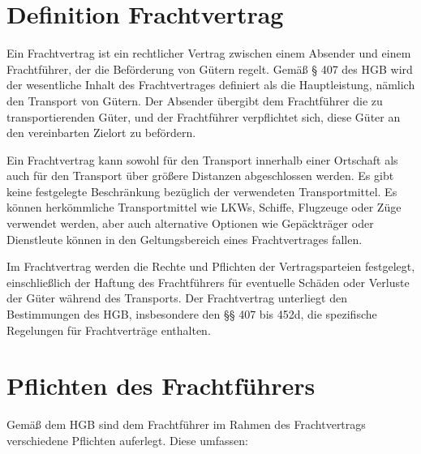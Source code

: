 \section[Definition]{Definition Frachtvertrag}

Ein Frachtvertrag ist ein rechtlicher Vertrag zwischen einem Absender und einem Frachtführer, der die Beförderung von Gütern regelt. Gemäß § 407 des \ac{HGB} wird der wesentliche Inhalt des Frachtvertrages definiert als die Hauptleistung, nämlich den Transport von Gütern. Der Absender übergibt dem Frachtführer die zu transportierenden Güter, und der Frachtführer verpflichtet sich, diese Güter an den vereinbarten Zielort zu befördern.

Ein Frachtvertrag kann sowohl für den Transport innerhalb einer Ortschaft als auch für den Transport über größere Distanzen abgeschlossen werden. Es gibt keine festgelegte Beschränkung bezüglich der verwendeten Transportmittel. Es können herkömmliche Transportmittel wie LKWs, Schiffe, Flugzeuge oder Züge verwendet werden, aber auch alternative Optionen wie Gepäckträger oder Dienstleute können in den Geltungsbereich eines Frachtvertrages fallen.

Im Frachtvertrag werden die Rechte und Pflichten der Vertragsparteien festgelegt, einschließlich der Haftung des Frachtführers für eventuelle Schäden oder Verluste der Güter während des Transports. Der Frachtvertrag unterliegt den Bestimmungen des \ac{HGB}, insbesondere den §§ 407 bis 452d, die spezifische Regelungen für Frachtverträge enthalten.

\section{Pflichten des Frachtführers}

Gemäß dem \ac{HGB} sind dem Frachtführer im Rahmen des Frachtvertrags verschiedene Pflichten auferlegt. Diese umfassen:

